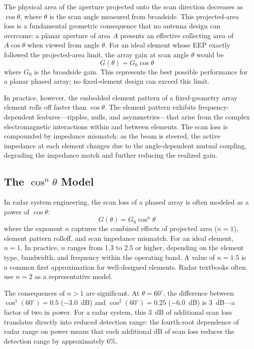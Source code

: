 The physical area of the aperture projected onto the scan direction decreases as $\cos\theta$, where $\theta$ is the scan angle measured from broadside.  This projected-area loss is a fundamental geometric consequence that no antenna design can overcome: a planar aperture of area $A$ presents an effective collecting area of $A\cos\theta$ when viewed from angle $\theta$.  For an ideal element whose EEP exactly followed the projected-area limit, the array gain at scan angle $\theta$ would be
%
\begin{equation}
G(\theta) = G_0 \cos\theta
\label{eq:RCA_costheta}
\end{equation}
%
where $G_0$ is the broadside gain.  This represents the best possible performance for a planar phased array; no fixed-element design can exceed this limit.

In practice, however, the embedded element pattern of a fixed-geometry array element rolls off faster than $\cos\theta$.  The element pattern exhibits frequency-dependent features---ripples, nulls, and asymmetries---that arise from the complex electromagnetic interactions within and between elements.  The scan loss is compounded by impedance mismatch: as the beam is steered, the active impedance at each element changes due to the angle-dependent mutual coupling, degrading the impedance match and further reducing the realized gain.

\subsection{The $\cos^n\theta$ Model}

In radar system engineering, the scan loss of a phased array is often modeled as a power of $\cos\theta$:
%
\begin{equation}
G(\theta) = G_0 \cos^n\theta
\label{eq:RCA_cosn}
\end{equation}
%
where the exponent $n$ captures the combined effects of projected area ($n = 1$), element pattern rolloff, and scan impedance mismatch.  For an ideal element, $n = 1$.  In practice, $n$ ranges from 1.3 to 2.5 or higher, depending on the element type, bandwidth, and frequency within the operating band.  A value of $n = 1.5$ is a common first approximation for well-designed elements.  Radar textbooks often use $n = 2$ as a representative model.

The consequences of $n > 1$ are significant.  At $\theta = 60^{\circ}$, the difference between $\cos^1(60^{\circ}) = 0.5$ ($-3.0$~dB) and $\cos^2(60^{\circ}) = 0.25$ ($-6.0$~dB) is 3~dB---a factor of two in power.  For a radar system, this 3~dB of additional scan loss translates directly into reduced detection range: the fourth-root dependence of radar range on power means that each additional dB of scan loss reduces the detection range by approximately 6\%.

